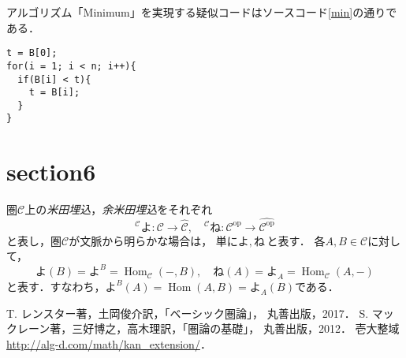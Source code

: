 \documentclass[14pt]{ltjsarticle}
\newcommand{\map}[3]{#1\colon#2\longrightarrow#3}
\theoremstyle{definition}
\numberwithin{thm}{section}
\DeclareMathOperator{\Hom}{Hom}
\renewcommand{\c}{\mathscr{C}}%
\newcommand{\op}{\mathrm{op}}%
\newcommand{\placeholder}{{-}}%
\newcommand{\yoneda}{\mbox{よ}}%
\newcommand{\yoyoneda}{\mbox{ね}}%
\begin{document}
アルゴリズム「Minimum」を実現する疑似コードはソースコード\ref{min}の通りである．
\newpage
\begin{lstlisting}[caption=Minimum,label=min]
t = B[0];
for(i = 1; i < n; i++){
  if(B[i] < t){
    t = B[i];
  }
}
  \end{lstlisting}

\section{section6}
圏\(\c\)上の\emph{米田埋込}，\emph{余米田埋込}をそれぞれ
\[
  \map{{}^{\c}\yoneda}{\c}{\widehat{\c}},\quad\map{{}^{\c}\yoyoneda}{\c^{\op}}{\widehat{\c^{\op}}}
\]
と表し，圏\(\c\)が文脈から明らかな場合は，
単に\(\yoneda,\,\yoyoneda\)と表す．
各\(A,B\in\c\)に対して，
\[
  \yoneda(B)=\yoneda^B = \Hom_\c (\placeholder, B),\quad
  \yoyoneda(A) = \yoneda_A = \Hom_\c (A, \placeholder)
\]
と表す．すなわち，\(\yoneda^B(A) = \Hom(A, B) = \yoneda_A(B)\)である．


\begin{thebibliography}{99}
   T. レンスター著，土岡俊介訳，「ベーシック圏論」，
  丸善出版，2017．
   S. マックレーン著，三好博之，高木理訳，「圏論の基礎」，
  丸善出版，2012．
   壱大整域 \url{http://alg-d.com/math/kan_extension/}．
\end{thebibliography}
\end{document}
